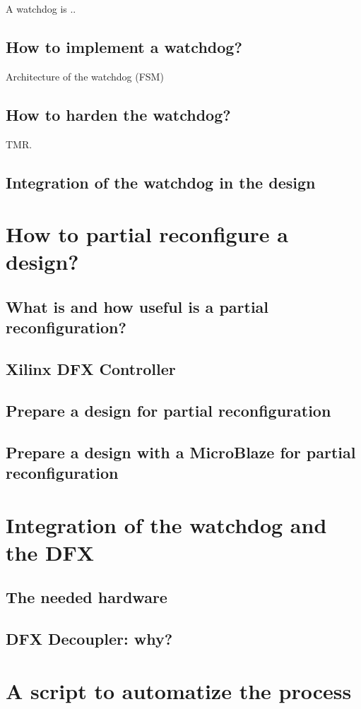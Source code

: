 A watchdog is ..

\subsection{How to implement a watchdog?}

Architecture of the watchdog (FSM)

\subsection{How to harden the watchdog?}

TMR.

\subsection{Integration of the watchdog in the design}

\section{How to partial reconfigure a design?}
\subsection{What is and how useful is a partial reconfiguration?}
\subsection{Xilinx DFX Controller}
\subsection{Prepare a design for partial reconfiguration}
\subsection{Prepare a design with a MicroBlaze for partial reconfiguration}

\section{Integration of the watchdog and the DFX}
\subsection{The needed hardware}
\subsection{DFX Decoupler: why?}

\section{A script to automatize the process}
